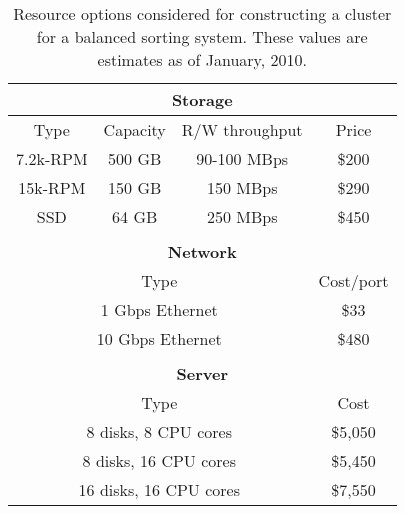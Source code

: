 \begin{table}[t]
\caption{Resource options considered for constructing a cluster for a
  balanced sorting system.  These values are estimates as of January, 2010.}
\label{tab:resourcesummary}
\begin{center}
\begin{tabular}{|c|c|c|c|}
\hline
\multicolumn{4}{|c|}{{\bf Storage}}\\
\hline
Type & Capacity & R/W throughput & Price\\
\hline
7.2k-RPM & 500 GB & 90-100 MBps & \$200\\
\hline
15k-RPM & 150 GB & 150 MBps & \$290\\
\hline
SSD     & 64 GB  & 250 MBps & \$450\\
\hline
\multicolumn{4}{c}{}\\
\hline
\multicolumn{4}{|c|}{{\bf Network}}\\
\hline
\multicolumn{3}{|c|}{Type} & Cost/port\\
\hline
\multicolumn{3}{|c|}{1 Gbps Ethernet} & \$33\\
\hline
\multicolumn{3}{|c|}{10 Gbps Ethernet} & \$480\\
\hline
\multicolumn{4}{c}{}\\
\hline
\multicolumn{4}{|c|}{{\bf Server}}\\
\hline
\multicolumn{3}{|c|}{Type} & Cost\\
\hline
\multicolumn{3}{|c|}{8 disks, 8 CPU cores} & \$5,050\\
\hline
\multicolumn{3}{|c|}{8 disks, 16 CPU cores} & \$5,450\\
\hline
\multicolumn{3}{|c|}{16 disks, 16 CPU cores} & \$7,550\\
\hline
\end{tabular}
\end{center}
\end{table}

